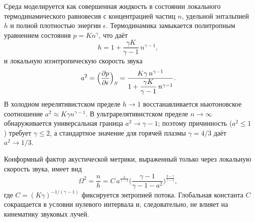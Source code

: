 \documentclass[12pt,a4paper,preprint]{elsarticle}
\begin{document}
            Среда моделируется как совершенная жидкость в состоянии локального термодинамического равновесия с концентрацией частиц $n$, удельной энтальпией $h$ и полной плотностью энергии $\epsilon$. Термодинамика замыкается политропным уравнением состояния $p = K n^{\gamma}$, что даёт
            \begin{equation}
                h = 1 + \frac{\gamma K}{\gamma-1}\, n^{\gamma-1} ,
                \label{eq:enthalpy-polytropic}
            \end{equation}
            и локальную изэнтропическую скорость звука
            \begin{equation}
                a^{2} = \Bigl(\frac{\partial p}{\partial\epsilon}\Bigr)_{S} = \frac{K\gamma\, n^{\gamma-1}}{1 + \dfrac{\gamma K}{\gamma-1}\, n^{\gamma-1}} .
                \label{eq:sound-speed-polytropic}
            \end{equation}
            В холодном нерелятивистском пределе $h\to 1$ восстанавливается ньютоновское соотношение $a^{2}\approx K\gamma n^{\gamma-1}$. В ультрарелятивистском пределе $n\to\infty$ обнаруживается универсальная граница $a^{2}\to\gamma-1$; поэтому причинность ($a^{2}\le 1$) требует $\gamma\le 2$, а стандартное значение для горячей плазмы $\gamma=4/3$ даёт $a^{2}\to 1/3$.

            Конформный фактор акустической метрики, выраженный только через локальную скорость звука, имеет вид
            \begin{equation}
                \Omega^{2} = \frac{n}{h} = C\, a^{\frac{2}{\gamma-1}} \Biggl( \frac{\gamma-1}{\gamma-1-a^{2}} \Biggr)^{\frac{2-\gamma}{\gamma-1}} ,
                \label{eq:conformal-factor}
            \end{equation}
            где $C=(K\gamma)^{-1/(\gamma-1)}$ фиксируется энтропией потока. Глобальная константа $C$ сокращается в условии нулевого интервала и, следовательно, не влияет на кинематику звуковых лучей.
\end{document}
